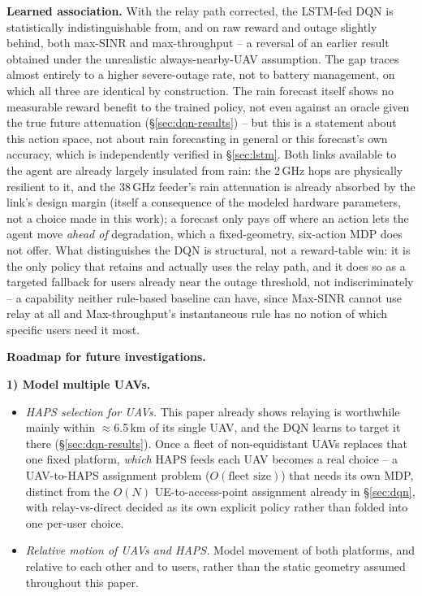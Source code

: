\documentclass[]{ieeeaccess}
\begin{document}
\textbf{Learned association.} With the relay path corrected, the LSTM-fed DQN is statistically indistinguishable from, and on raw reward and outage slightly behind, both max-SINR and max-throughput -- a reversal of an earlier result obtained under the unrealistic always-nearby-UAV assumption. The gap traces almost entirely to a higher severe-outage rate, not to battery management, on which all three are identical by construction. The rain forecast itself shows no measurable reward benefit to the trained policy, not even against an oracle given the true future attenuation (\S\ref{sec:dqn-results}) -- but this is a statement about this action space, not about rain forecasting in general or this forecast's own accuracy, which is independently verified in \S\ref{sec:lstm}. Both links available to the agent are already largely insulated from rain: the 2\,GHz hops are physically resilient to it, and the 38\,GHz feeder's rain attenuation is already absorbed by the link's design margin (itself a consequence of the modeled hardware parameters, not a choice made in this work); a forecast only pays off where an action lets the agent move \emph{ahead of} degradation, which a fixed-geometry, six-action MDP does not offer. What distinguishes the DQN is structural, not a reward-table win: it is the only policy that retains and actually uses the relay path, and it does so as a targeted fallback for users already near the outage threshold, not indiscriminately -- a capability neither rule-based baseline can have, since Max-SINR cannot use relay at all and Max-throughput's instantaneous rule has no notion of which specific users need it most.

\textbf{Roadmap for future investigations.}

\textbf{1) Model multiple UAVs.}
\begin{itemize}\setlength{\itemsep}{1pt}
  \item \emph{HAPS selection for UAVs.} This paper already shows relaying is worthwhile mainly within $\approx$6.5\,km of its single UAV, and the DQN learns to target it there (\S\ref{sec:dqn-results}). Once a fleet of non-equidistant UAVs replaces that one fixed platform, \emph{which} HAPS feeds each UAV becomes a real choice -- a UAV-to-HAPS assignment problem ($O(\text{fleet size})$) that needs its own MDP, distinct from the $O(N)$ UE-to-access-point assignment already in \S\ref{sec:dqn}, with relay-vs-direct decided as its own explicit policy rather than folded into one per-user choice.
  \item \emph{Relative motion of UAVs and HAPS.} Model movement of both platforms, and relative to each other and to users, rather than the static geometry assumed throughout this paper.
\end{itemize}
\end{document}

